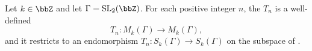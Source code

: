 \begin{theorem} \label{theorem:hecke_operators_are_well_defined_linear_operators_on_modular_forms}
Let $k \in \bbZ$ and let $\Gamma = \mathrm{SL}_2(\bbZ)$. For each positive integer $n$, the  $T_n$ is a well-defined 
$$T_n : M_k(\Gamma) \longrightarrow M_k(\Gamma),$$
and it restricts to an endomorphism $T_n : S_k(\Gamma) \to S_k(\Gamma)$ on the subspace of .


\end{theorem}


